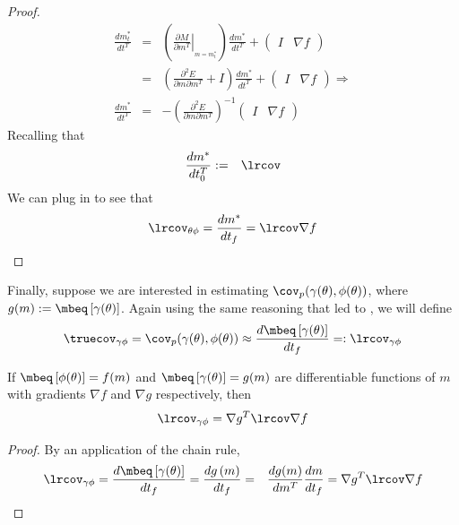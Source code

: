 \begin{proof}
\begin{eqnarray*}
  \frac{dm_{t}^{*}}{dt^{T}} & = &
    \left(\left.\frac{\partial M}{\partial m^{T}}\right|_{_{m=m_{t}^{*}}}\right)
    \frac{dm^{*}}{dt^{T}}+\left(\begin{array}{cc}
  I & \nabla f\end{array}\right)\\
   & = & \left(\frac{\partial^{2}E}{\partial m\partial m^{T}}+
    I\right)\frac{dm^{*}}{dt^{T}}+\left(\begin{array}{cc}
  I & \nabla f\end{array}\right) \Rightarrow \\
  \frac{dm^{*}}{dt^{T}} & = &
    -\left(\frac{\partial^{2}E}{\partial m\partial m^{T}}\right)^{-1}
    \left(\begin{array}{cc}I & \nabla f\end{array}\right)
  \end{eqnarray*}
  Recalling that
  \begin{eqnarray*}
  \frac{dm^{*}}{dt_{0}^{T}} & := & \lrcov
  \end{eqnarray*}
  We can plug in to see that
  \begin{equation}
  \lrcov_{\theta\phi} = \frac{dm^{*}}{dt_{f}} = \lrcov \nabla f
  \end{equation}
\end{proof}
%
Finally, suppose we are interested in estimating $\cov_p(\gamma(\theta),
\phi(\theta))$, where $g(m) := \mbeq\left[\gamma(\theta)\right]$.  Again using
the same reasoning that led to , we will define
%
\begin{equation*}
\truecov_{\gamma\phi} = \cov_p(\gamma(\theta), \phi(\theta))
\approx \frac{d \mbeq\left[\gamma(\theta)\right]}{dt_f} =: \lrcov_{\gamma\phi}
\end{equation*}
%
\begin{proposition} \label{prop:function_function_covariance}
  If $\mbeq\left[\phi(\theta)\right] = f(m)$ and
  $\mbeq\left[\gamma(\theta)\right] = g(m)$ are differentiable functions of $m$
  with gradients $\nabla f$ and $\nabla g$ respectively, then
  $$
    \lrcov_{\gamma\phi} = \nabla g^{T}\lrcov \nabla f
  $$
\end{proposition}
%
\begin{proof}
  By  an application of the chain rule,
  \begin{eqnarray*}
  \lrcov_{\gamma\phi} =
  \frac{d \mbeq\left[\gamma(\theta)\right]}{dt_f} =
  \frac{d g\left(m\right)}{dt_f} & = & \frac{dg(m)}{dm^{T}}\frac{dm}{dt_{f}}
    =  \nabla g^{T}\lrcov \nabla f
  \end{eqnarray*}
\end{proof}

